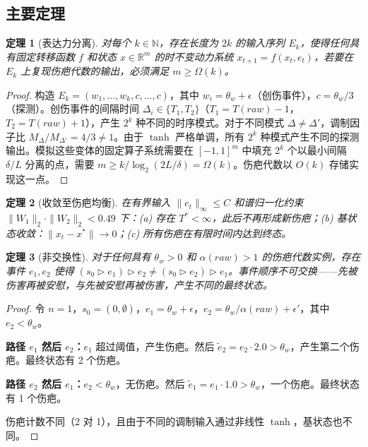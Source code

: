 \documentclass[11pt]{article}
\newtheorem{theorem}{定理}[section]
\begin{document}
\subsection{主要定理}

\begin{theorem}[表达力分离]
\label{thm:scar-expressiveness}
对每个 $k \in \mathbb{N}$，存在长度为 $2k$ 的输入序列 $E_k$，使得任何具有固定转移函数 $f$ 和状态 $x \in \mathbb{R}^m$ 的时不变动力系统 $x_{t+1} = f(x_t, e_t)$，若要在 $E_k$ 上复现伤疤代数的输出，必须满足 $m \geq \Omega(k)$。
\end{theorem}

\begin{proof}
构造 $E_k = (w_1, \ldots, w_k, c, \ldots, c)$，其中 $w_i = \theta_w + \epsilon$（创伤事件），$c = \theta_w/3$（探测）。创伤事件的间隔时间 $\Delta_i \in \{T_1, T_2\}$（$T_1 = T(raw) - 1$，$T_2 = T(raw) + 1$），产生 $2^k$ 种不同的时序模式。对于不同模式 $\Delta \neq \Delta'$，调制因子比 $M_\Delta / M_{\Delta'} = 4/3 \neq 1$。由于 $\tanh$ 严格单调，所有 $2^k$ 种模式产生不同的探测输出。模拟这些变体的固定算子系统需要在 $[-1,1]^m$ 中填充 $2^k$ 个以最小间隔 $\delta/L$ 分离的点，需要 $m \geq k / \log_2(2L/\delta) = \Omega(k)$。伤疤代数以 $O(k)$ 存储实现这一点。
\end{proof}

\begin{theorem}[收敛至伤疤均衡]
\label{thm:scar-convergence}
在有界输入 $\|e_t\|_\infty \leq C$ 和谱归一化约束 $\|W_1\|_2 \cdot \|W_2\|_2 < 0.49$ 下：(a) 存在 $T^* < \infty$，此后不再形成新伤疤；(b) 基状态收敛：$\|x_t - x^*\| \to 0$；(c) 所有伤疤在有限时间内达到终态。
\end{theorem}

\begin{theorem}[非交换性]
\label{thm:scar-noncommute}
对于任何具有 $\theta_w > 0$ 和 $\alpha(raw) > 1$ 的伤疤代数实例，存在事件 $e_1, e_2$ 使得 $(s_0 \triangleright e_1) \triangleright e_2 \neq (s_0 \triangleright e_2) \triangleright e_1$。事件顺序不可交换——先被伤害再被安慰，与先被安慰再被伤害，产生不同的最终状态。
\end{theorem}

\begin{proof}
令 $n=1$，$s_0 = (0, \emptyset)$，$e_1 = \theta_w + \epsilon$，$e_2 = \theta_w / \alpha(raw) + \epsilon'$，其中 $e_2 < \theta_w$。

\textbf{路径 $e_1$ 然后 $e_2$：}$e_1$ 超过阈值，产生伤疤。然后 $\tilde{e}_2 = e_2 \cdot 2.0 > \theta_w$，产生第二个伤疤。最终状态有 2 个伤疤。

\textbf{路径 $e_2$ 然后 $e_1$：}$e_2 < \theta_w$，无伤疤。然后 $\tilde{e}_1 = e_1 \cdot 1.0 > \theta_w$，一个伤疤。最终状态有 1 个伤疤。

伤疤计数不同（2 对 1），且由于不同的调制输入通过非线性 $\tanh$，基状态也不同。
\end{proof}
\end{document}
